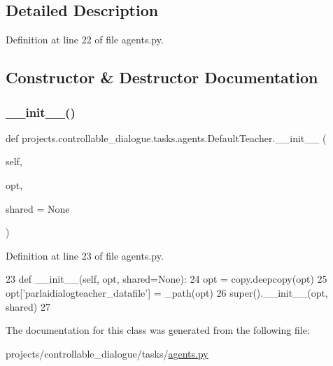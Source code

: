\subsection{Detailed Description}


Definition at line 22 of file agents.\+py.



\subsection{Constructor \& Destructor Documentation}
\mbox{\label{classprojects_1_1controllable__dialogue_1_1tasks_1_1agents_1_1DefaultTeacher_a7e4547b329d721d43fda08c58a5e901c}} 
\subsubsection{\texorpdfstring{\+\_\+\+\_\+init\+\_\+\+\_\+()}{\_\_init\_\_()}}
{\footnotesize\ttfamily def projects.\+controllable\+\_\+dialogue.\+tasks.\+agents.\+Default\+Teacher.\+\_\+\+\_\+init\+\_\+\+\_\+ (\begin{DoxyParamCaption}\item[{}]{self,  }\item[{}]{opt,  }\item[{}]{shared = {\ttfamily None} }\end{DoxyParamCaption})}



Definition at line 23 of file agents.\+py.


\begin{DoxyCode}
23     \textcolor{keyword}{def }\_\_init\_\_(self, opt, shared=None):
24         opt = copy.deepcopy(opt)
25         opt[\textcolor{stringliteral}{'parlaidialogteacher\_datafile'}] = \_path(opt)
26         super().\_\_init\_\_(opt, shared)
27 \end{DoxyCode}


The documentation for this class was generated from the following file\+:\begin{DoxyCompactItemize}
\item 
projects/controllable\+\_\+dialogue/tasks/\hyperlink{projects_2controllable__dialogue_2tasks_2agents_8py}{agents.\+py}\end{DoxyCompactItemize}
